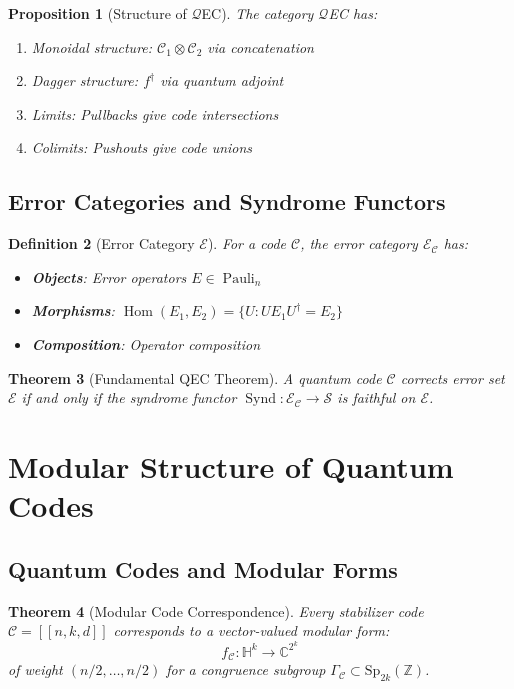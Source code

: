 \documentclass[12pt,a4paper]{article}
\newtheorem{theorem}{Theorem}[section]
\newtheorem{proposition}[theorem]{Proposition}
\newtheorem{definition}[theorem]{Definition}
\DeclareMathOperator{\Hom}{Hom}
\DeclareMathOperator{\Synd}{Synd}
\DeclareMathOperator{\Pauli}{Pauli}
\newcommand{\bbH}{\mathbb{H}}
\newcommand{\bbC}{\mathbb{C}}
\newcommand{\bbZ}{\mathbb{Z}}
\begin{document}
\begin{proposition}[Structure of $\mathcal{Q}$EC]
The category $\mathcal{Q}$EC has:
\begin{enumerate}
\item Monoidal structure: $\mathcal{C}_1 \otimes \mathcal{C}_2$ via concatenation
\item Dagger structure: $f^\dagger$ via quantum adjoint
\item Limits: Pullbacks give code intersections
\item Colimits: Pushouts give code unions
\end{enumerate}
\end{proposition}

\subsection{Error Categories and Syndrome Functors}

\begin{definition}[Error Category $\mathcal{E}$]
For a code $\mathcal{C}$, the error category $\mathcal{E}_\mathcal{C}$ has:
\begin{itemize}
\item \textbf{Objects}: Error operators $E \in \Pauli_n$
\item \textbf{Morphisms}: $\Hom(E_1, E_2) = \{U : UE_1U^\dagger = E_2\}$
\item \textbf{Composition}: Operator composition
\end{itemize}
\end{definition}

\begin{theorem}[Fundamental QEC Theorem]
A quantum code $\mathcal{C}$ corrects error set $\mathcal{E}$ if and only if the syndrome functor $\Synd: \mathcal{E}_\mathcal{C} \to \mathcal{S}$ is faithful on $\mathcal{E}$.
\end{theorem}

\section{Modular Structure of Quantum Codes}

\subsection{Quantum Codes and Modular Forms}

\begin{theorem}[Modular Code Correspondence]
Every stabilizer code $\mathcal{C} = [[n, k, d]]$ corresponds to a vector-valued modular form:
\[
f_\mathcal{C}: \bbH^k \to \bbC^{2^k}
\]
of weight $(n/2, \ldots, n/2)$ for a congruence subgroup $\Gamma_\mathcal{C} \subset \text{Sp}_{2k}(\bbZ)$.
\end{theorem}
\end{document}

